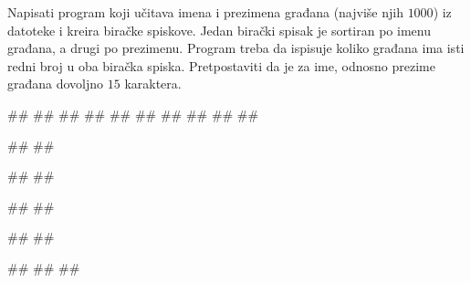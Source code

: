 \begin{Answer}[ref=508]
\end{Answer}
\begin{Exercise}[label=509]
  Napisati program koji učitava imena i prezimena građana (najviše
  njih $1000$) iz datoteke  i kreira
  biračke spiskove. Jedan birački spisak je sortiran po imenu građana,
  a drugi po prezimenu. Program treba da ispisuje koliko građana ima
  isti redni broj u oba biračka spiska. Pretpostaviti da je za ime,
  odnosno prezime građana dovoljno $15$ karaktera.

\begin{minitest}
\begin{test}{1}
##    
##
##
##
##
##
##
##
##
##

#\naslovIzlaz#
##
\end{test}
\end{minitest}
\begin{minitest}
\begin{test}{2}
##
##
  
#\naslovIzlaz#
##
\end{test}
\end{minitest}
\begin{minitest}
\begin{test}{3}
##
##
  
#\naslovIzlaz#
##
##
\end{test}
\end{minitest}
  
\end{Exercise}

